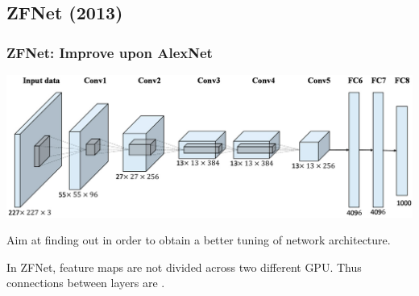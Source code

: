 \subsection{ZFNet (2013)}

\begin{frame}
	\frametitle{ZFNet: Improve upon AlexNet}


	\bigskip

	\begin{center}
		\includegraphics[scale=0.6]{figs/AlexNet}
	\end{center}

	\bigskip

	Aim at finding out  in order to obtain a better tuning of network architecture.

	\bigskip

	In ZFNet, feature maps are not divided across two different GPU. Thus connections between layers are .
\end{frame}

